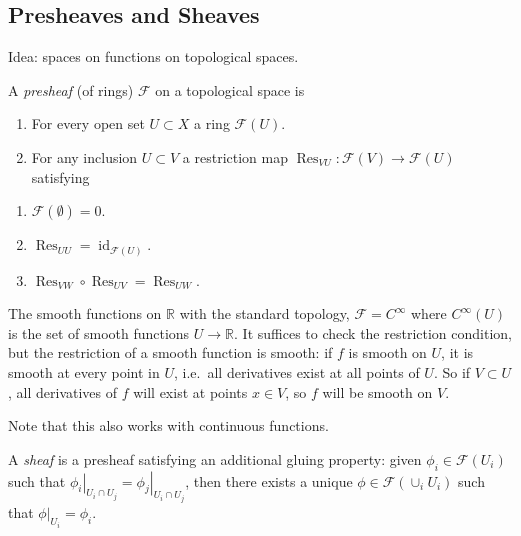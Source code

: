 \hypertarget{presheaves-and-sheaves}{%
\subsection{Presheaves and Sheaves}\label{presheaves-and-sheaves}}

Idea: spaces on functions on topological spaces.

\begin{definition}[Presheaf]

A \emph{presheaf} (of rings) \(\mathcal{F}\) on a topological space is

\begin{enumerate}
\def\labelenumi{\arabic{enumi}.}
\item
  For every open set \(U\subset X\) a ring \(\mathcal{F}(U)\).
\item
  For any inclusion \(U\subset V\) a restriction map
  \(\operatorname{Res}_{VU}: \mathcal{F}(V) \to \mathcal{F}(U)\)
  satisfying
\end{enumerate}

\begin{enumerate}
\def\labelenumi{\alph{enumi}.}
\tightlist
\item
  \(\mathcal{F}(\emptyset) = 0\).
\item
  \(\operatorname{Res}_{UU} = \operatorname{id}_{\mathcal{F}(U)}\).
\item
  \(\operatorname{Res}_{VW} \circ \operatorname{Res}_{UV} = \operatorname{Res}_{UW}\).
\end{enumerate}

\end{definition}

\begin{example}

The smooth functions on \({\mathbb{R}}\) with the standard topology,
\(\mathcal{F} = C^\infty\) where \(C^\infty(U)\) is the set of smooth
functions \(U\to {\mathbb{R}}\). It suffices to check the restriction
condition, but the restriction of a smooth function is smooth: if \(f\)
is smooth on \(U\), it is smooth at every point in \(U\), i.e.~all
derivatives exist at all points of \(U\). So if \(V\subset U\), all
derivatives of \(f\) will exist at points \(x \in V\), so \(f\) will be
smooth on \(V\).

Note that this also works with continuous functions.

\end{example}

\begin{definition}[Sheaf]

A \emph{sheaf} is a presheaf satisfying an additional gluing property:
given \(\phi_i \in \mathcal{F}(U_i)\) such that
\({\left.{{\phi_i}} \right|_{{U_i\cap U_j}} } = {\left.{{\phi_j}} \right|_{{U_i \cap U_j}} }\),
then there exists a unique \(\phi\in \mathcal{F}(\cup_i U_i)\) such that
\({\left.{{\phi}} \right|_{{U_i}} } = \phi_i\).

\end{definition}

